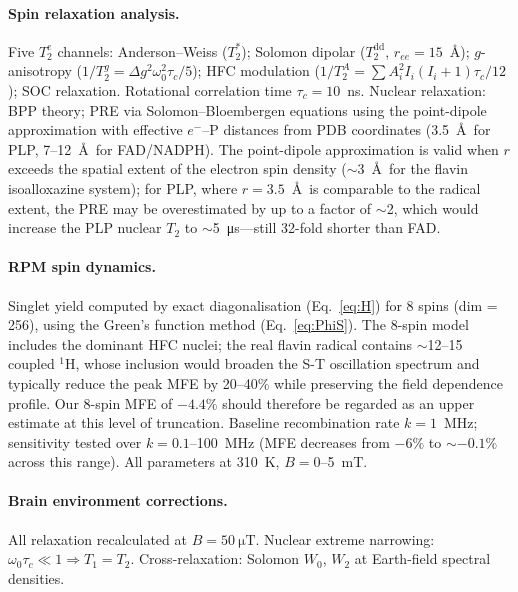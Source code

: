 \documentclass[11pt]{article}
\begin{document}
\paragraph{Spin relaxation analysis.}
Five $T_2^e$ channels: Anderson--Weiss ($T_2^*$)\cite{Abragam1961}; Solomon dipolar ($T_2^\mathrm{dd}$, $r_{ee} = 15$~\AA); $g$-anisotropy ($1/T_2^g = \Delta g^2\omega_0^2\tau_c/5$); HFC modulation ($1/T_2^A = \sum A_i^2 I_i(I_i+1)\tau_c/12$); SOC relaxation. Rotational correlation time $\tau_c = 10$~ns. Nuclear relaxation: BPP theory\cite{Abragam1961}; PRE via Solomon--Bloembergen equations\cite{Solomon1955} using the point-dipole approximation with effective $e^-$--P distances from PDB coordinates (3.5~\AA\ for PLP, 7--12~\AA\ for FAD/NADPH). The point-dipole approximation is valid when $r$ exceeds the spatial extent of the electron spin density ($\sim$3~\AA\ for the flavin isoalloxazine system); for PLP, where $r = 3.5$~\AA\ is comparable to the radical extent, the PRE may be overestimated by up to a factor of $\sim$2, which would increase the PLP nuclear $T_2$ to $\sim$5~\si{\micro\second}---still 32-fold shorter than FAD.

\paragraph{RPM spin dynamics.}
Singlet yield computed by exact diagonalisation (Eq.~\ref{eq:H}) for 8 spins (dim = 256), using the Green's function method (Eq.~\ref{eq:PhiS}). The 8-spin model includes the dominant HFC nuclei; the real flavin radical contains $\sim$12--15 coupled $^1$H, whose inclusion would broaden the S-T oscillation spectrum and typically reduce the peak MFE by 20--40\% while preserving the field dependence profile\cite{Hiscock2016}. Our 8-spin MFE of $-4.4\%$ should therefore be regarded as an upper estimate at this level of truncation. Baseline recombination rate $k = 1$~MHz; sensitivity tested over $k = 0.1$--100~MHz (MFE decreases from $-6\%$ to $\sim$$-0.1\%$ across this range). All parameters at 310~K, $B = 0$--5~mT.

\paragraph{Brain environment corrections.}
All relaxation recalculated at $B = 50~\si{\micro\tesla}$. Nuclear extreme narrowing: $\omega_0\tau_c \ll 1 \Rightarrow T_1 = T_2$. Cross-relaxation: Solomon $W_0$, $W_2$ at Earth-field spectral densities.
\end{document}
